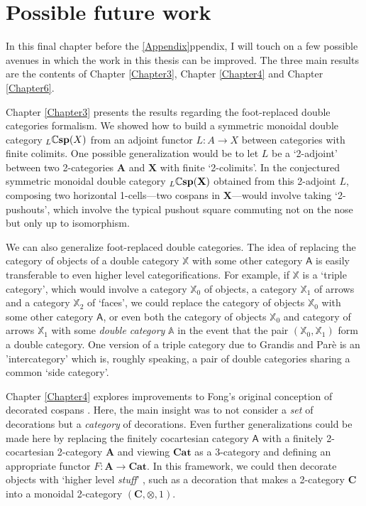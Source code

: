 \documentclass[oneside,final]{ucr}
\theoremstyle{definition}
\newcommand{\define}[1]{{\bf \boldmath #1}}
\begin{document}
{\ssp
\chapter{Possible future work}

In this final chapter before the \ref{Appendix}ppendix, I will touch on a few possible avenues in which the work in this thesis can be improved. The three main results are the contents of Chapter \ref{Chapter3}, Chapter \ref{Chapter4} and Chapter \ref{Chapter6}.

Chapter \ref{Chapter3} presents the results regarding the foot-replaced double categories formalism. 
We showed how to build a symmetric monoidal double category $_L \mathbb{C}\define{sp}(X)$ from an
adjoint functor $L: A \to X$ between categories with finite colimits. One possible generalization would be to let
$L$ be a `2-adjoint' between two 2-categories $\mathbf{A}$ and $\mathbf{X}$ with finite `2-colimits'. In the conjectured symmetric monoidal double category $_L \mathbb{C} \define{sp}(\mathbf{X})$ obtained from this 2-adjoint $L$, composing two horizontal 1-cells---two cospans in $\mathbf{X}$---would involve taking `2-pushouts', which involve the typical pushout square commuting not on the nose but only up to isomorphism.

We can also generalize foot-replaced double categories. The idea of replacing the category of objects of a double category $\mathbb{X}$ with some other category $\mathsf{A}$ is easily transferable to even higher level categorifications. For example, if $\mathbb{X}$ is a `triple category', which would involve a category $\mathbb{X}_0$ of objects, a category $\mathbb{X}_1$ of arrows and a category $\mathbb{X}_2$ of `faces', we could replace the category of objects $\mathbb{X}_0$ with some other category $\mathsf{A}$, or even both the category of objects $\mathbb{X}_0$ and category of arrows $\mathbb{X}_1$ with some \emph{double category} $\mathbb{A}$ in the event that the pair $(\mathbb{X}_0,\mathbb{X}_1)$ form a double category. One version of a triple category due to Grandis and Par\`e \cite{GP3} is an 'intercategory'  which is, roughly speaking, a pair of double categories sharing a common `side category'. 

Chapter \ref{Chapter4} explores improvements to Fong's original conception of decorated cospans \cite{Fong}. Here, the main insight was to not consider a \emph{set} of decorations but a \emph{category} of decorations. Even further generalizations could be made here by replacing the finitely cocartesian category $\mathsf{A}$ with a finitely 2-cocartesian 2-category $\mathbf{A}$ and viewing $\mathbf{Cat}$ as a 3-category and defining an appropriate functor $F \colon \mathbf{A} \to \mathbf{Cat}$. In this framework, we could then decorate objects with `higher level \emph{stuff}' \cite{BS}, such as a decoration that makes a 2-category $\mathbf{C}$ into a monoidal 2-category $(\mathbf{C},\otimes,1)$.

}
\end{document}
